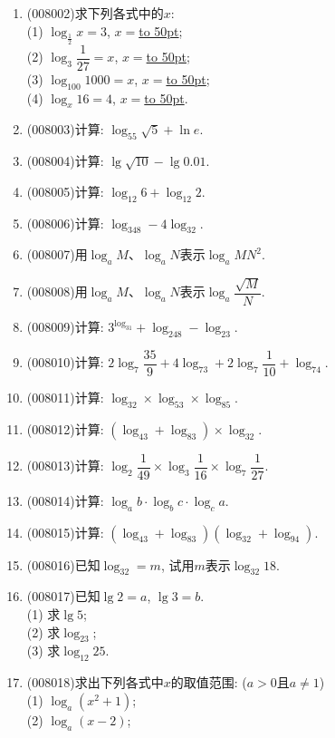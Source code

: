 \documentclass[10pt,a4paper]{article}
\newcommand{\blank}[1]{\underline{\hbox to #1pt{}}}
\begin{document}
\begin{enumerate}[1.]
(1) $x=\log _{16}32$:\blank{50};\\
(2) $\log _{\pi }x=4$:\blank{50};\\
(3) $\log _x9=2$:\blank{50}.
\item {\tiny (008002)}求下列各式中的$x$:\\
(1) $\log _{\frac 12}x=3$, $x=$\blank{50};\\
(2) $\log _3\dfrac 1{27}=x$, $x=$\blank{50};\\
(3) $\log _{100}1000=x$, $x=$\blank{50};\\
(4) $\log _x16=4$, $x=$\blank{50}.
\item {\tiny (008003)}计算: $\log _55\sqrt 5+\ln e$.
\item {\tiny (008004)}计算: $\lg \sqrt {10}-\lg 0.01$.
\item {\tiny (008005)}计算: $\log _{12}6+\log _{12}2$.
\item {\tiny (008006)}计算: $\log _348-4\log _32$.
\item {\tiny (008007)}用$\log _aM$、$\log _aN$表示$\log _aMN^2$.
\item {\tiny (008008)}用$\log _aM$、$\log _aN$表示$\log _a\dfrac{\sqrt M}N$.
\item {\tiny (008009)}计算: $3^{\log _31}+\log _248-\log _23$.
\item {\tiny (008010)}计算: $2\log _7\dfrac{35}9+4\log _73+2\log _7\dfrac 1{10}+\log _74$.
\item {\tiny (008011)}计算: $\log _32\times \log _53\times \log _85$.
\item {\tiny (008012)}计算: $(\log _43+\log _83)\times \log _32$.
\item {\tiny (008013)}计算: $\log _2\dfrac 1{49}\times \log _3\dfrac 1{16}\times \log _7\dfrac 1{27}$.
\item {\tiny (008014)}计算: $\log _ab\cdot \log _bc\cdot \log _ca$.
\item {\tiny (008015)}计算: $(\log _43+\log _83)(\log _32+\log _94)$.
\item {\tiny (008016)}已知$\log _32=m$, 试用$m$表示$\log _{32}18$.
\item {\tiny (008017)}已知$\lg 2=a$, $\lg 3=b$.\\
(1) 求$\lg 5$;\\
(2) 求$\log _23$;\\
(3) 求$\log _{12}25$.
\item {\tiny (008018)}求出下列各式中$x$的取值范围: ($a>0$且$a\ne 1$)\\
(1) $\log _a(x^2+1)$;\\
(2) $\log _a(x-2)$;\\

\end{enumerate}
\end{document}
